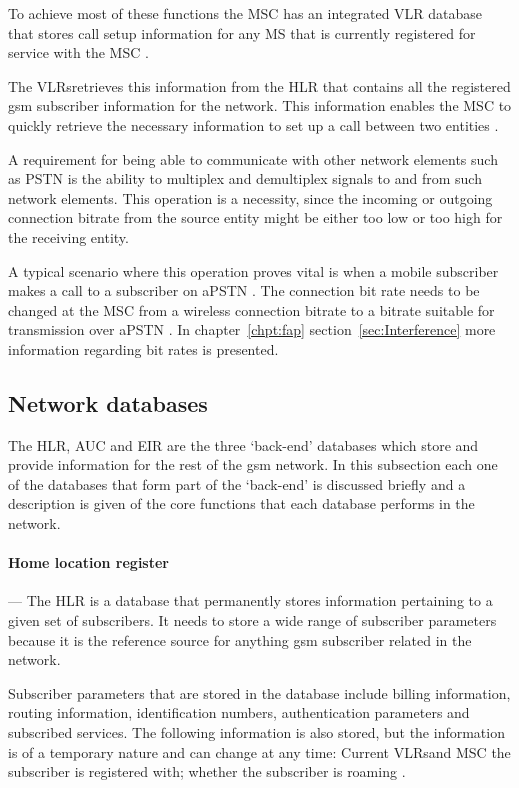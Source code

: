 To achieve most of these functions the \gls{MSC} has an integrated \gls{VLR} database that stores call setup information for any \gls{MS} that is currently registered for service with the \gls{MSC} \cite{GSM92,wirelesstelcoMullet}. 

The \glspl{VLR}retrieves this information from the \gls{HLR} that contains all the registered \gls{gsm} subscriber information for the network. This information enables the \gls{MSC} to quickly retrieve the necessary information to set up a call between two entities \cite{GSMSysEngin,GSMSecurInTeleNetwork}.

A requirement for being able to communicate with other network elements such as \gls{PSTN} is the ability to multiplex and demultiplex signals to and from such network elements. This operation is a necessity, since the incoming or outgoing connection bitrate from the source entity might be either too low or too high for the receiving entity.

A typical scenario where this operation proves vital is when a mobile subscriber makes a call to a subscriber on a\gls{PSTN} \@. The connection bit rate needs to be changed at the \gls{MSC} from a wireless connection bitrate to a bitrate suitable for transmission over a\gls{PSTN} \@. In chapter~\ref{chpt:fap} section~\ref{sec:Interference} more information regarding bit rates is presented.

\subsection{Network databases}
The \gls{HLR},  \gls{AUC} and \gls{EIR} are the three `back-end' databases which store and provide information for the rest of the \gls{gsm} network. In this subsection each one of the databases that form part of the `back-end' is discussed briefly and a description is given of the core functions that each database performs in the network.

\paragraph{Home location register}
--- The \gls{HLR} is a database that permanently stores information pertaining to a given set of subscribers. It needs to store a wide range of subscriber parameters because it is the reference source for anything \gls{gsm} subscriber related in the network. 

Subscriber parameters that are stored in the database include billing information, routing information, identification numbers, authentication parameters and subscribed services. The following information is also stored, but the information is of a temporary nature and can change at any time: Current \glspl{VLR}and \gls{MSC} the subscriber is registered with; whether the subscriber is roaming \cite{GSMSysEngin}.

